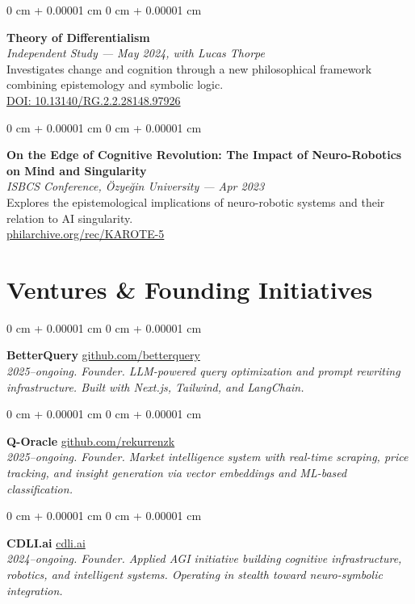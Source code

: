\documentclass[10pt, letterpaper]{article}
\newenvironment{onecolentry}{
    \begin{adjustwidth}{
        0 cm + 0.00001 cm
    }{
        0 cm + 0.00001 cm
    }
}{
    \end{adjustwidth}
} %
\begin{document}
\begin{onecolentry}
    \textbf{Theory of Differentialism} \\
    \textit{Independent Study — May 2024, with Lucas Thorpe} \\
    Investigates change and cognition through a new philosophical framework combining epistemology and symbolic logic. \\
    \href{https://doi.org/10.13140/RG.2.2.28148.97926}{DOI: 10.13140/RG.2.2.28148.97926}
\end{onecolentry}
\vspace{0.2cm}

\begin{onecolentry}
    \textbf{On the Edge of Cognitive Revolution: The Impact of Neuro-Robotics on Mind and Singularity} \\
    \textit{ISBCS Conference, Özyeğin University — Apr 2023} \\
    Explores the epistemological implications of neuro-robotic systems and their relation to AI singularity. \\
    \href{https://philarchive.org/rec/KAROTE-5}{philarchive.org/rec/KAROTE-5}
\end{onecolentry}


\section{Ventures \& Founding Initiatives}
\begin{onecolentry}
    \textbf{BetterQuery} \hfill \href{https://github.com/betterquery}{github.com/betterquery} \\
    \textit{2025–ongoing. Founder. LLM-powered query optimization and prompt rewriting infrastructure. Built with Next.js, Tailwind, and LangChain.}
\end{onecolentry}
\vspace{0.2cm}

\begin{onecolentry}
    \textbf{Q-Oracle} \hfill \href{https://github.com/rekurrenzk}{github.com/rekurrenzk} \\
    \textit{2025–ongoing. Founder. Market intelligence system with real-time scraping, price tracking, and insight generation via vector embeddings and ML-based classification.}
\end{onecolentry}
\vspace{0.2cm}

\begin{onecolentry}
    \textbf{CDLI.ai} \hfill \href{https://cdli.ai}{cdli.ai} \\
    \textit{2024–ongoing. Founder. Applied AGI initiative building cognitive infrastructure, robotics, and intelligent systems. Operating in stealth toward neuro-symbolic integration.}
\end{onecolentry}
\vspace{0.2cm}
\end{document}
